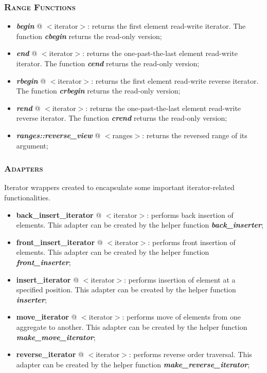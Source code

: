 \documentclass[10pt]{article}
\begin{document}
\begin{multicols*}{5}
{\subsubsection*{\textsc{Range Functions}} 
\begin{itemize}[leftmargin=*,topsep=0.25pt]
  \setlength\itemsep{-1.8pt}
	\item  \emph{\textbf{begin}} @ $<$iterator$>$: returns the first element read-write iterator. The function \emph{\textbf{cbegin}} returns the read-only version;
	\item  \emph{\textbf{end}} @ $<$iterator$>$: returns the one-past-the-last element read-write iterator. The function \emph{\textbf{cend}} returns the read-only version;
	\item  \emph{\textbf{rbegin}} @ $<$iterator$>$: returns the first element read-write reverse iterator. The function \emph{\textbf{crbegin}} returns the read-only version;
	\item  \emph{\textbf{rend}} @ $<$iterator$>$: returns the one-past-the-last element read-write reverse iterator. The function \emph{\textbf{crend}} returns the read-only version;
	\item  \emph{\textbf{ranges::reverse\_view}} @ $<$ranges$>$: returns the reversed range of its argument;
\end{itemize}

\subsubsection*{\textsc{Adapters}} 
\noindent
Iterator wrappers created to encapsulate some important iterator-related functionalities. 
\begin{itemize}[leftmargin=*,topsep=0.25pt]
  \setlength\itemsep{-1.8pt}
	\item \textbf{back\_insert\_iterator} @ $<$iterator$>$: performs back insertion of elements. This adapter can be created by the helper function \emph{\textbf{back\_inserter}};
	\item \textbf{front\_insert\_iterator} @ $<$iterator$>$: performs front insertion of elements. This adapter can be created by the helper function \emph{\textbf{front\_inserter}};
	\item \textbf{insert\_iterator} @ $<$iterator$>$: performs insertion of element at a specified position. This adapter can be created by the helper function \emph{\textbf{inserter}};
	\item \textbf{move\_iterator} @ $<$iterator$>$: performs move of elements from one aggregate to another. This adapter can be created by the helper function \emph{\textbf{make\_move\_iterator}};
	\item \textbf{reverse\_iterator} @ $<$iterator$>$: performs reverse order traversal. This adapter can be created by the helper function \emph{\textbf{make\_reverse\_iterator}};
\end{itemize}

}
\end{multicols*}
\end{document}
